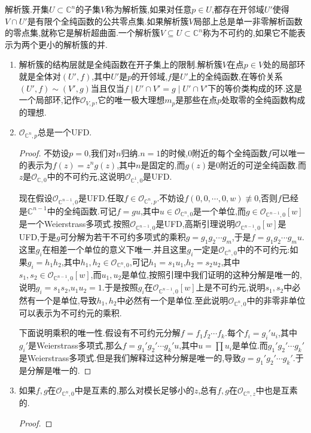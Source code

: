 解析簇.开集$U\subset\mathbb{C}^n$的子集$V$称为解析簇,如果对任意$p\in U$,都存在开邻域$U'$使得$V\cap U'$是有限个全纯函数的公共零点集.如果解析簇$V$局部上总是单一非零解析函数的零点集,就称它是解析超曲面.一个解析簇$V\subseteq U\subset\mathbb{C}^n$称为不可约的,如果它不能表示为两个更小的解析簇的并.
\begin{enumerate}
	\item 解析簇的结构层就是全纯函数在开子集上的限制.解析簇$V$在点$p\in V$处的局部环就是全体对$(U',f)$,其中$U'$是$p$的开邻域,$f$是$U'$上的全纯函数,在等价关系$(U',f)\sim(V',g)$当且仅当$f\mid U'\cap V'=g\mid U'\cap V'$下的等价类构成的环.这是一个局部环,记作$\mathscr{O}_{V,p}$,它的唯一极大理想$m_p$是那些在点$p$处取零的全纯函数构成的理想.
	\item $\mathscr{O}_{\mathbb{C}^n,p}$总是一个UFD.
	\begin{proof}
		
		不妨设$p=0$,我们对$n$归纳.$n=1$的时候,0附近的每个全纯函数$f$可以唯一的表示为$f(z)=z^ng(z)$,其中$n$是固定的,而$g(z)$是0附近的可逆全纯函数.而$z$是$\mathscr{O}_{\mathbb{C},0}$中的不可约元,这说明$\mathscr{O}_{\mathbb{C}^1,0}$是UFD.
		
		现在假设$\mathscr{O}_{\mathbb{C}^{n-1},0}$是UFD.任取$f\in\mathscr{O}_{\mathbb{C}^n,p}$.不妨设$f(0,0,\cdots,0,w)\not\equiv0$,否则$f$已经是$\mathbb{C}^{n-1}$中的全纯函数.可记$f=gu$,其中$u\in\mathscr{O}_{\mathbb{C}^n,0}$是一个单位,而$g\in\mathscr{O}_{\mathbb{C}^{n-1},0}[w]$是一个Weierstrass多项式.按照$\mathscr{O}_{\mathbb{C}^{n-1},0}$是UFD,高斯引理说明$\mathscr{O}_{\mathbb{C}^{n-1},0}[w]$是UFD,于是$g$可分解为若干不可约多项式的乘积$g=g_1g_2\cdots g_m$,于是$f=g_1g_2\cdots g_mu$.这里$g_i$在相差一个单位的意义下唯一.并且这里$g_i$一定是$\mathscr{O}_{\mathbb{C}^n,0}$中的不可约元:如果$g_i=h_1h_2$,其中$h_1,h_2\in\mathscr{O}_{\mathbb{C}^n,0}$,可记$h_1=s_1u_1$,$h_2=s_2u_2$,其中$s_1,s_2\in\mathscr{O}_{\mathbb{C}^{n-1},0}[w]$,而$u_1,u_2$是单位,按照引理中我们证明的这种分解是唯一的,说明$g_i=s_1s_2$,$u_1u_2=1$.于是按照$g_i$在$\mathscr{O}_{\mathbb{C}^{n-1},0}[w]$上是不可约元,说明$s_1,s_2$中必然有一个是单位,导致$h_1,h_2$中必然有一个是单位.至此说明$\mathscr{O}_{\mathbb{C}^n,0}$中的非零非单位可以表示为不可约元的乘积.
		
		下面说明乘积的唯一性.假设有不可约元分解$f=f_1f_2\cdots f_k$.每个$f_i=g_i'u_i$,其中$g_i'$是Weierstrass多项式,那么$f=g_1'g_2'\cdots g_k'u$,其中$u=\prod u_i$是单位.而$g_1'g_2'\cdots g_k'$是Weierstrass多项式.但是我们解释过这种分解是唯一的,导致$g=g_1'g_2'\cdots g_k'$.于是分解是唯一的.
	\end{proof}
	\item 如果$f,g$在$\mathscr{O}_{\mathbb{C}^n,0}$中是互素的,那么对模长足够小的$z$,总有$f,g$在$\mathscr{O}_{\mathbb{C}^n,z}$中也是互素的.
	\begin{proof}
		

\end{proof}
\end{enumerate}
